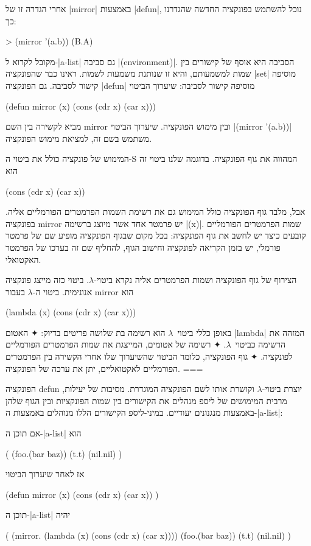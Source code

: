 אחרי הגדרה זו של \E|mirror| באמצעות \E|defun|, נוכל להשתמש בפונקציה החדשה
שהגדרנו כך:
\begin{LISP}
> (mirror '(a.b))
(B.A)
\end{LISP}

מקובל לקרוא ל-\E|a-list| גם סביבה \E|(environment)|. הסביבה היא אוסף של קישורים
בין שמות למשמעותם, והיא זו שנותנת משמעות לשמות. ראינו כבר שהפונקציה \E|set|
מוסיפה קישור לסביבה. גם הפונקציה \E|defun| מוסיפה קישור לסביבה: שיערוך הביטוי
\begin{LISP}
(defun mirror (x) (cons (cdr x) (car x)))
\end{LISP}
מביא לקשירה בין השם mirror ובין מימוש הפונקציה. שיערוך הביטוי \T|(mirror
'(a.b))| משתמש בשם זה, למציאת מימוש הפונקציה.

המימוש של פונקציה כולל את ביטוי ה-S המהווה את גוף הפונקציה. בדוגמה שלנו ביטוי
זה הוא
\begin{LISP}
(cons (cdr x) (car x))
\end{LISP}
אבל, מלבד גוף הפונקציה כולל המימוש גם את רשימת השמות הפרמטרים הפורמליים אליה.
בפונקציה mirror יש פרמטר אחד אשר מיוצג ברשימה \T|(x)|. שמות הפרמטרים הפורמליים
קובעים כיצד יש לחשב את גוף הפונקציה: בכל מקום שבגוף הפונקציה מופיע שם של פרמטר
פורמלי, יש בזמן הקריאה לפונקציה וחישוב הגוף, להחליף שם זה בערכו של הפרמטר
האקטואלי.

הצירוף של גוף הפונקציה ושמות הפרמטרים אליה נקרא ביטוי-$λ$. ביטוי כזה
מייצג פונקציה אנונימית. ביטוי ה-$λ$ בעבור mirror הוא
\begin{LISP}
  (lambda (x) (cons (cdr x) (car x)))
\end{LISP}
באופן כללי ביטוי~$λ$ הוא רשימה בת שלושה פריטים בדיוק:
✦ האטום \T|lambda| המזהה את הרשימה כביטוי~$λ$.
✦ רשימה של אטומים, המייצגת את שמות הפרמטרים הפורמליים לפונקציה.
✦ גוף הפונקציה, כלומר הביטוי שהשיערוך שלו אחרי הקשירה בין הפרמטרים
הפורמליים לאקטואליים, יתן את ערכה של הפונקציה.
===

הפונקציה defun יוצרת ביטוי-$λ$ וקושרת אותו לשם הפונקציה המוגדרת. מסיבות של
יעילות, מרבית המימושים של ליספ מנהלים את הקישורים בין שמות הפונקציות ובין הגוף
שלהן באמצעות מנגנונים יעודיים. במיני-ליספ הקישורים הללו מנוהלים באמצעות
ה-\E|a-list|:

אם תוכן ה-\E|a-list| הוא
\begin{LISP}
(
  (foo.(bar baz))
  (t.t)
  (nil.nil)
)
\end{LISP}
אז לאחר שיערוך הביטוי
\begin{LISP}
(defun
  mirror (x)
  (cons (cdr x) (car x))
)
\end{LISP}
תוכן ה-\E|a-list| יהיה
\begin{LISP}
(
  (mirror.
     (lambda (x)
        (cons (cdr x) (car x))))
  (foo.(bar baz))
  (t.t)
  (nil.nil)
)
\end{LISP}

